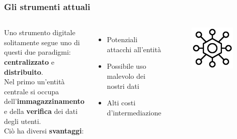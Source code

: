 \documentclass{beamer}
\begin{document}
\begin{frame}
	\frametitle{Gli strumenti attuali}
	\medskip
	\begin{columns}
		Uno strumento digitale solitamente segue uno di questi due paradigmi:
		\textbf{centralizzato} e \textbf{distribuito}. \\
		Nel primo un'entità centrale si occupa dell'\textbf{immagazzinamento} e della \textbf{verifica} dei dati
		degli utenti.\\ Ciò ha diversi \textbf{svantaggi}:
		\begin{itemize}
			\item Potenziali attacchi all'entità
			\item Possibile uso malevolo dei nostri dati
			\item Alti costi d'intermediazione
		\end{itemize}
		\begin{figure}
			\includegraphics[width=0.90\textwidth]{cent.png}
		\end{figure}
	\end{columns}
\end{frame}
\end{document}
